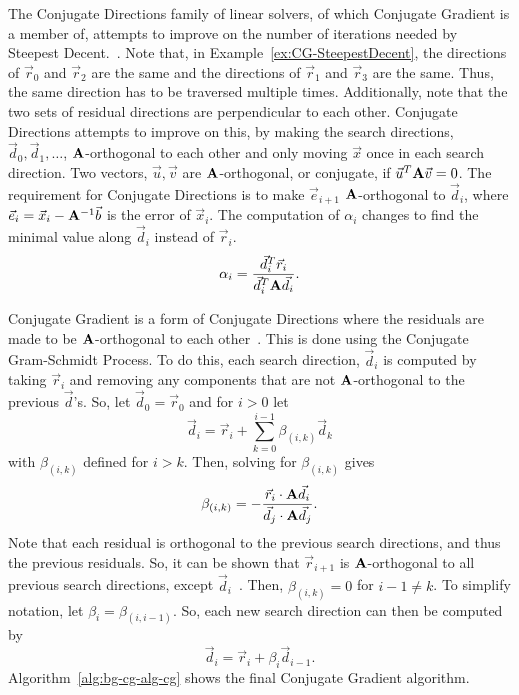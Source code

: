 The Conjugate Directions family of linear solvers, of which Conjugate Gradient is a member of, attempts to improve on the number of iterations needed by Steepest Decent.~\cite{Shewchuk:1994:IntroToCG}.
Note that, in Example~\ref{ex:CG-SteepestDecent}, the directions of \(\vec{r}_0\) and \(\vec{r}_2\) are the same and the directions of \(\vec{r}_1\) and \(\vec{r}_3\) are the same.
Thus, the same direction has to be traversed multiple times.
Additionally, note that the two sets of residual directions are perpendicular to each other.
Conjugate Directions attempts to improve on this, by making the search directions, \(\vec{d}_0, \vec{d}_1, \dots\), \(\mathbf{A}\)-orthogonal to each other and only moving \(\vec{x}\) once in each search direction.
Two vectors, \(\vec{u}, \vec{v}\) are \(\mathbf{A}\)-orthogonal, or conjugate, if \(\vec{u}^T\mathbf{A}\vec{v}=0\).
The requirement for Conjugate Directions is to make \(\vec{e}_{i+1}\) \(\mathbf{A}\)-orthogonal to \(\vec{d}_i\), where \(\vec{e}_i = \vec{x}_i - \mathbf{A}^{-1}\vec{b}\) is the error of \(\vec{x}_i\).
The computation of \(\alpha_i\) changes to find the minimal value along \(\vec{d}_i\) instead of \(\vec{r}_i\).
\[
	\alpha_i = \frac{\vec{d}_i^T\vec{r}_i}{\vec{d}_i^T\mathbf{A}\vec{d}_i}.
\]

Conjugate Gradient is a form of Conjugate Directions where the residuals are made to be \(\mathbf{A}\)-orthogonal to each other~\cite{Shewchuk:1994:IntroToCG}.
This is done using the Conjugate Gram-Schmidt Process.
To do this, each search direction, \(\vec{d}_i\) is computed by taking \(\vec{r}_i\) and removing any components that are not \(\mathbf{A}\)-orthogonal to the previous \(\vec{d}\)'s.
So, let \(\vec{d}_0 = \vec{r}_0\) and for \(i > 0\) let
\[
	\vec{d}_i = \vec{r}_i + \sum_{k=0}^{i-1} \beta_{(i, k)}\vec{d}_k
\]
with \(\beta_{(i, k)}\) defined for \(i > k\).
Then, solving for \(\beta_{(i, k)}\) gives
\[
	\beta_{(i, k)} = -\frac{\vec{r}_i\cdot\mathbf{A}\vec{d}_i}{\vec{d}_j\cdot\mathbf{A}\vec{d}_j}.
\]
Note that each residual is orthogonal to the previous search directions, and thus the previous residuals.
So, it can be shown that \(\vec{r}_{i+1}\) is \(\mathbf{A}\)-orthogonal to all previous search directions, except \(\vec{d}_i\)~\cite{Shewchuk:1994:IntroToCG}.
Then, \(\beta_{(i, k)} = 0\) for \(i-1 \neq k\).
To simplify notation, let \(\beta_i = \beta_{(i, i-1)}\).
So, each new search direction can then be computed by
\[
	\vec{d}_i = \vec{r}_i + \beta_i\vec{d}_{i-1}.
\]
Algorithm~\ref{alg:bg-cg-alg-cg} shows the final Conjugate Gradient algorithm.

